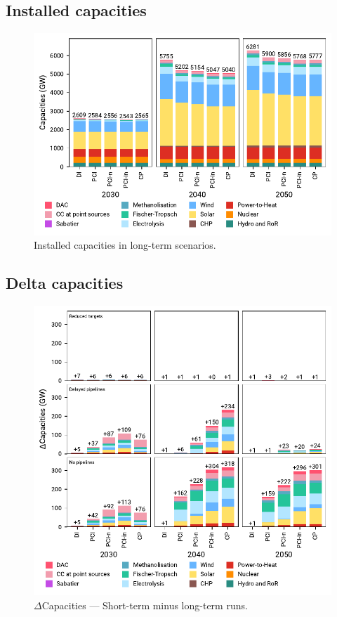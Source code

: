 \documentclass[preprint,12pt,sort&compress]{elsarticle}
\begin{document}
\subsection{Installed capacities}
\label{sec:installed_capacities}
\begin{figure}[htbp]
  \centering
  \includegraphics[width=\textwidth]{capacities_overview.pdf}
  \caption{Installed capacities in long-term scenarios.}
  \label{fig:capacities_overview}
\end{figure}

\clearpage
\subsection{Delta capacities}
\label{sec:delta_system_costs}
\begin{figure}[htbp]
  \centering
  \includegraphics[width=\textwidth]{capacities_overview_extended.pdf}
  \caption{$\Delta$Capacities --- Short-term minus long-term runs.}
  \label{fig:capacities_overview_extended}
\end{figure}
\end{document}
